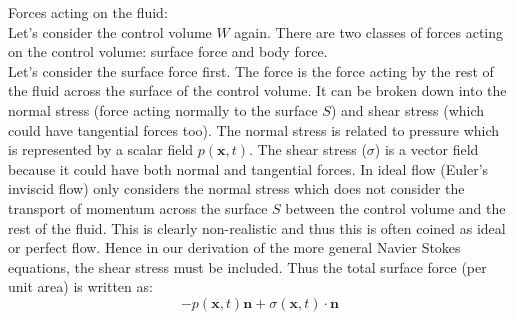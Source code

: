 Forces acting on the fluid:\\
Let's consider the control volume $W$ again. There are two classes of forces acting on the control volume: surface force and body force.\\
Let's consider the surface force first. The force is the force acting by the rest of the fluid across the surface of the control volume. It can be broken down into the normal stress (force acting normally to the surface $S$) and shear stress (which could have tangential forces too). The normal stress is related to pressure which is represented by a scalar field $p(\textbf{x},t)$. The shear stress ($\textbf{$\sigma$}$) is a vector field because it could have both normal and tangential forces. In ideal flow (Euler's inviscid flow) only considers the normal stress which does not consider the transport of momentum across the surface $S$ between the control volume and the rest of the fluid. This is clearly non-realistic and thus this is often coined as ideal or perfect flow. Hence in our derivation of the more general Navier Stokes equations, the shear stress must be included. Thus the total surface force (per unit area) is written as:
\begin{equation}
- p(\textbf{x},t) \textbf{n} + \textbf{$\sigma$} (\textbf{x},t)\cdot \textbf{n}
\end{equation}


